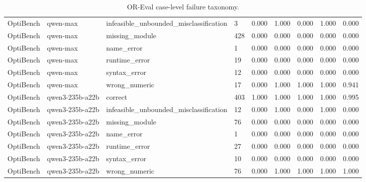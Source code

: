 \begin{table}[t]
\begin{tabular}{lllllllll}
OptiBench & qwen-max & infeasible\_unbounded\_misclassification & 3 & 0.000 & 1.000 & 0.000 & 1.000 & 0.000 \\
OptiBench & qwen-max & missing\_module & 428 & 0.000 & 0.000 & 0.000 & 0.000 & 0.000 \\
OptiBench & qwen-max & name\_error & 1 & 0.000 & 0.000 & 0.000 & 0.000 & 0.000 \\
OptiBench & qwen-max & runtime\_error & 19 & 0.000 & 0.000 & 0.000 & 0.000 & 0.000 \\
OptiBench & qwen-max & syntax\_error & 12 & 0.000 & 0.000 & 0.000 & 0.000 & 0.000 \\
OptiBench & qwen-max & wrong\_numeric & 17 & 0.000 & 1.000 & 1.000 & 1.000 & 0.941 \\
OptiBench & qwen3-235b-a22b & correct & 403 & 1.000 & 1.000 & 1.000 & 1.000 & 0.995 \\
OptiBench & qwen3-235b-a22b & infeasible\_unbounded\_misclassification & 12 & 0.000 & 1.000 & 0.000 & 1.000 & 0.000 \\
OptiBench & qwen3-235b-a22b & missing\_module & 76 & 0.000 & 0.000 & 0.000 & 0.000 & 0.000 \\
OptiBench & qwen3-235b-a22b & name\_error & 1 & 0.000 & 0.000 & 0.000 & 0.000 & 0.000 \\
OptiBench & qwen3-235b-a22b & runtime\_error & 27 & 0.000 & 0.000 & 0.000 & 0.000 & 0.000 \\
OptiBench & qwen3-235b-a22b & syntax\_error & 10 & 0.000 & 0.000 & 0.000 & 0.000 & 0.000 \\
OptiBench & qwen3-235b-a22b & wrong\_numeric & 76 & 0.000 & 1.000 & 1.000 & 1.000 & 1.000 \\
\bottomrule
\end{tabular}
\caption{OR-Eval case-level failure taxonomy.}
\label{tab:or_eval_failure}
\end{table}

